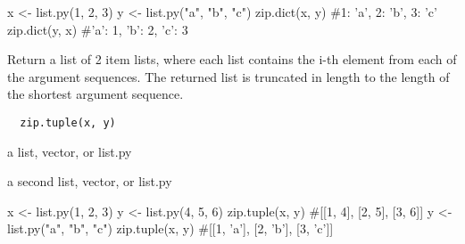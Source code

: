 \documentclass[a4paper]{book}
\begin{document}
%
\begin{Examples}
\begin{ExampleCode}
x <- list.py(1, 2, 3)
y <- list.py("a", "b", "c")
zip.dict(x, y)
#{1: 'a', 2: 'b', 3: 'c'}
zip.dict(y, x)
#{'a': 1, 'b': 2, 'c': 3}
\end{ExampleCode}
\end{Examples}
%
\begin{Description}\relax
Return a list of 2 item lists, where each list contains
the i-th element from each of the argument sequences.
The returned list is truncated in length to the length of
the shortest argument sequence.
\end{Description}
%
\begin{Usage}
\begin{verbatim}
  zip.tuple(x, y)
\end{verbatim}
\end{Usage}
%
\begin{Arguments}
\begin{ldescription}
\item[\code{x}] a list, vector, or list.py

\item[\code{y}] a second list, vector, or list.py
\end{ldescription}
\end{Arguments}
%
\begin{Examples}
\begin{ExampleCode}
x <- list.py(1, 2, 3)
y <- list.py(4, 5, 6)
zip.tuple(x, y)
#[[1, 4], [2, 5], [3, 6]]
y <- list.py("a", "b", "c")
zip.tuple(x, y)
#[[1, 'a'], [2, 'b'], [3, 'c']]
\end{ExampleCode}
\end{Examples}
\printindex{}
\end{document}
